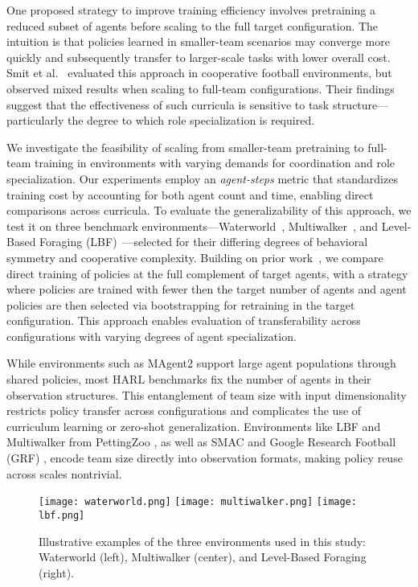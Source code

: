 \documentclass{article}
\begin{document}
One proposed strategy to improve training efficiency involves pretraining a 
reduced subset of agents before scaling to the full target configuration. 
The intuition is that policies learned in smaller-team scenarios may converge 
more quickly and subsequently transfer to larger-scale tasks with lower overall cost. 
Smit et al.~\cite{smit2023} evaluated this approach in cooperative football environments, 
but observed mixed results when scaling to full-team configurations. Their findings 
suggest that the effectiveness of such curricula is sensitive to task structure—particularly 
the degree to which role specialization is required.

We investigate the feasibility of scaling from smaller-team pretraining to full-team 
training in environments with varying demands for coordination and role specialization.
Our experiments employ an \emph{agent-steps} metric that standardizes training cost by 
accounting for both agent count and time, enabling direct comparisons across curricula. 
To evaluate the generalizability of this approach, we test it on three benchmark 
environments—Waterworld~\cite{gupta2017}, Multiwalker~\cite{gupta2017}, 
and Level-Based Foraging (LBF)~\cite{papoudakis2021}—selected for their 
differing degrees of behavioral symmetry and cooperative complexity. 
Building on prior work~\cite{smit2023}, we compare 
direct training of policies at the full complement of target agents, with a strategy 
where policies are trained with fewer then the target number of agents and agent 
policies are then selected via bootstrapping for retraining in the target configuration.
This approach enables evaluation of transferability across configurations with 
varying degrees of agent specialization.

While environments such as MAgent2 \cite{zheng2017} support large agent populations through 
shared policies, most HARL benchmarks fix the number of agents in their observation structures. 
This entanglement of team size with input dimensionality restricts policy transfer across 
configurations and complicates the use of curriculum learning or zero-shot generalization. 
Environments like LBF and Multiwalker from PettingZoo \cite{terry2021}, as well as 
SMAC \cite{samvelyan2019} and Google Research Football (GRF) \cite{kurach2020}, 
encode team size directly into observation formats, making policy reuse across scales nontrivial.


\begin{figure}[h]
    \centering
    \texttt{[image: waterworld.png]}
    \hfill
    \texttt{[image: multiwalker.png]}
    \hfill
    \texttt{[image: lbf.png]}
    \caption{Illustrative examples of the three environments used in this study: Waterworld (left), Multiwalker (center), and Level-Based Foraging (right).}
    \label{fig:envs-overview}
\end{figure}
\end{document}
